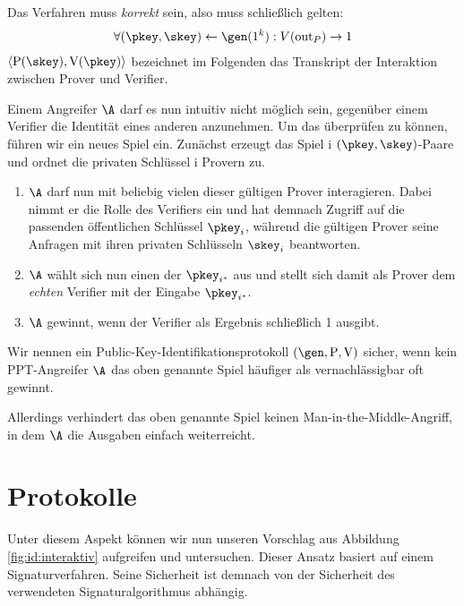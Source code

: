 Das Verfahren muss \emph{korrekt} sein, also muss schließlich gelten:
\begin{align*}
\forall (\pkey, \skey) \leftarrow \gen(1^k): V(\mathrm{out}_P) \rightarrow 1
\end{align*}
$\langle \mathrm{P}(\skey), \mathrm{V}(\pkey) \rangle$ bezeichnet im Folgenden das Transkript der Interaktion zwischen Prover und Verifier.

Einem Angreifer $\A$ darf es nun intuitiv nicht möglich sein, gegenüber einem Verifier die Identität eines anderen anzunehmen. Um das
überprüfen zu können, führen wir ein neues Spiel ein. Zunächst erzeugt das Spiel i $(\pkey, \skey)$-Paare und ordnet die privaten
Schlüssel i Provern zu.
\begin{enumerate}
  \item $\A$ darf nun mit beliebig vielen dieser gültigen Prover interagieren. Dabei nimmt er die Rolle des Verifiers ein und hat
  demnach Zugriff auf die passenden öffentlichen Schlüssel $\pkey_i$, während die gültigen Prover seine Anfragen mit ihren
  privaten Schlüsseln $\skey_i$ beantworten.
  \item $\A$ wählt sich nun einen der $\pkey_{i^*}$ aus und stellt sich damit als Prover dem \emph{echten} Verifier mit der Eingabe
  $\pkey_{i^*}$.
  \item $\A$ gewinnt, wenn der Verifier als Ergebnis schließlich 1 ausgibt.
\end{enumerate}
Wir nennen ein Public-Key-Identifikationsprotokoll $(\gen, \mathrm{P}, \mathrm{V})$ sicher, wenn kein PPT-Angreifer $\A$ das oben
genannte Spiel häufiger als vernachlässigbar oft gewinnt.

Allerdings verhindert das oben genannte Spiel keinen Man-in-the-Middle-Angriff, in dem $\A$ die Ausgaben einfach weiterreicht.


\section{Protokolle}
Unter diesem Aspekt können wir nun unseren Vorschlag aus Abbildung \ref{fig:id:interaktiv} aufgreifen und untersuchen. Dieser Ansatz basiert auf einem
Signaturverfahren. Seine Sicherheit ist demnach von der Sicherheit des verwendeten Signaturalgorithmus abhängig.~\\

